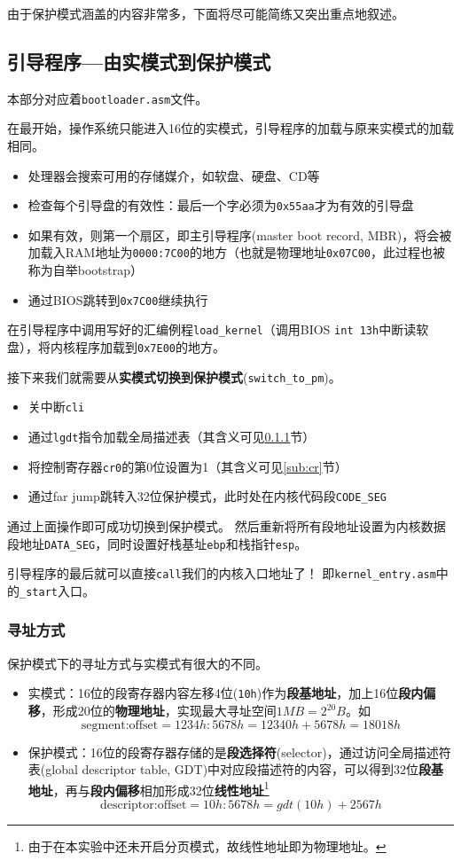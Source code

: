 \documentclass[logo,reportComp]{thesis}
\begin{document}
由于保护模式涵盖的内容非常多，下面将尽可能简练又突出重点地叙述。

\subsection{引导程序---由实模式到保护模式}
本部分对应着\verb'bootloader.asm'文件。

在最开始，操作系统只能进入16位的实模式，引导程序的加载与原来实模式的加载相同。
\begin{itemize}
	\item 处理器会搜索可用的存储媒介，如软盘、硬盘、CD等
	\item 检查每个引导盘的有效性：最后一个字必须为\verb'0x55aa'才为有效的引导盘
	\item 如果有效，则第一个扇区，即主引导程序(master boot record, MBR)，将会被加载入RAM地址为\verb'0000:7C00'的地方（也就是物理地址\verb'0x07C00'，此过程也被称为自举bootstrap）
	\item 通过BIOS跳转到\verb'0x7C00'继续执行
\end{itemize}

在引导程序中调用写好的汇编例程\verb'load_kernel'（调用BIOS \verb'int 13h'中断读软盘），将内核程序加载到\verb'0x7E00'的地方。

接下来我们就需要从\textbf{实模式切换到保护模式}(\verb'switch_to_pm')。
\begin{itemize}
	\item 关中断\verb'cli'
	\item 通过\verb'lgdt'指令加载全局描述表（其含义可见\ref{sub:gdt}节）
	\item 将控制寄存器\verb'cr0'的第0位设置为1（其含义可见\ref{sub:cr}节）
	\item 通过far jump跳转入32位保护模式，此时处在内核代码段\verb'CODE_SEG'
\end{itemize}

通过上面操作即可成功切换到保护模式。
然后重新将所有段地址设置为内核数据段地址\verb'DATA_SEG'，同时设置好栈基址\verb'ebp'和栈指针\verb'esp'。

引导程序的最后就可以直接\verb'call'我们的内核入口地址了！
即\verb'kernel_entry.asm'中的\verb'_start'入口。

\subsubsection{寻址方式}
\label{sub:gdt}
保护模式下的寻址方式与实模式有很大的不同。
\begin{itemize}
	\item 实模式：16位的段寄存器内容左移4位(\verb'10h')作为\textbf{段基地址}，加上16位\textbf{段内偏移}，形成20位的\textbf{物理地址}，实现最大寻址空间$1MB=2^{20}B$。如
	\[\text{segment:offset}=1234h:5678h=12340h+5678h=18018h\]
	\item 保护模式：16位的段寄存器存储的是\textbf{段选择符}(selector)，通过访问全局描述符表(global descriptor table, GDT)中对应段描述符的内容，可以得到32位\textbf{段基地址}，再与\textbf{段内偏移}相加形成32位\textbf{线性地址}\footnote{由于在本实验中还未开启分页模式，故线性地址即为物理地址。}
	\[\text{descriptor:offset}=10h:5678h=gdt(10h)+2567h\]
\end{itemize}
\end{document}
